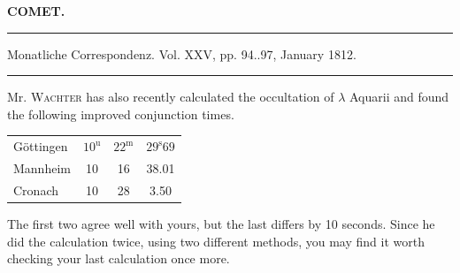 \clearpage{}
\begin{center}\textbf{COMET.}\par\vspace{4pt}\hrule\vspace{4pt}\fontsize{10}{12}\selectfont Monatliche Correspondenz. Vol. XXV, pp. 94..97, January 1812.\par\vspace{4pt}\hrule\vspace{4pt}\end{center}

\par{}

\par\indent Mr. \textsc{Wachter} has also recently calculated the occultation of $\lambda$ Aquarii and found the following improved conjunction times.

\begin{center}
\fontsize{10}{12}\selectfont\setlength{\tabcolsep}{6pt}\renewcommand{\arraystretch}{1.15}\begin{tabular}{l|ccc}
Göttingen & $10^{\text{u}}$ & $22^{\text{m}}$ & $29^{\text{s}}69$ \\
Mannheim & 10 & 16 & 38.01 \\
Cronach & 10 & 28 & 3.50 \\
\end{tabular}
\end{center}

\noindent The first two agree well with yours, but the last differs by 10 seconds. Since he did the calculation twice, using two different methods, you may find it worth checking your last calculation once more.
